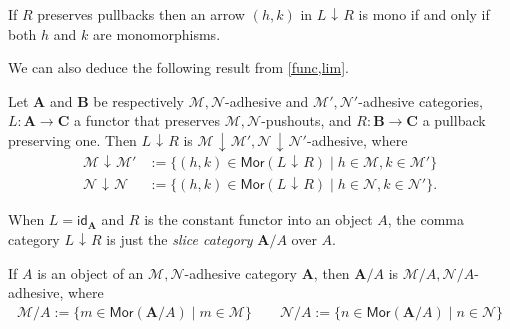 \documentclass[runningheads,envcountsect]{lmcs}
\newcommand{\catname}[1]{\mathbf{#1}}
\newcommand{\id}[1]{\mathsf{id}_{#1}}
\newcommand{\comma}[2]{#1\hspace{1pt} {\downarrow}\hspace{1pt} #2}
\newcommand{\cma}[2]{\mathcal{#1}\hspace{1pt} {\downarrow}\hspace{1pt} \mathcal{#2}}
\theoremstyle{plain}
\theoremstyle{definition}
\begin{document}
\begin{cor}\label{cor:mono}
If $R$ preserves pullbacks then an arrow $(h,k)$ in $\comma{L}{R}$ is mono if and only if both $h$ and $k$ are monomorphisms.
\end{cor}
We can also deduce the following result from \cref{func,lim}.
\begin{thm}\label{comma} 
	Let $\catname{A}$ and $\catname{B}$ be respectively $\mathcal{M},\mathcal{N}$-adhesive and $\mathcal{M}',\mathcal{N}'$-adhesive categories,  $L:\catname{A}\rightarrow \catname{C}$ a functor that preserves $\mathcal{M}, \mathcal{N}$-pushouts, and  $R:\catname{B}\rightarrow \catname{C}$ a pullback preserving one. Then $\comma{L}{R}$ is $\cma{M}{M'}, \cma{N}{N'}$-adhesive, where 
	\begin{align*}
	\cma{M}{M}'&:=\{(h,k)\in \mathsf{Mor}(\comma{L}{R}) \mid h\in \mathcal{M}, k\in \mathcal{M}'\}\\
	\cma{N}{N}&:=\{(h,k)\in \mathsf{Mor}(\comma{L}{R}) \mid h\in \mathcal{N}, k\in \mathcal{N}'\}.
	\end{align*}
\end{thm}
When $L=\id{\catname{A}}$ and $R$ is the constant functor into an object $A$, the comma category $\comma{L}{R}$ is just the \emph{slice category} $\catname{A}/A$ over $A$. 
\begin{cor}\label{cor:slice}
	If $A$ is an object of an $\mathcal{M}, \mathcal{N}$-adhesive category $\catname{A}$, then $\catname{A}/A$ is $\mathcal{M}/A, \mathcal{N}/A$-adhesive, where
\begin{align*}\mathcal{M}/A:=\{m\in  \mathsf{Mor}(\catname{A}/A) \mid m\in \mathcal{M} \}\qquad
\mathcal{N}/A:=\{n\in  \mathsf{Mor}(\catname{A}/A) \mid n\in \mathcal{N} \}
\end{align*}	
	
\end{cor}
\end{document}
